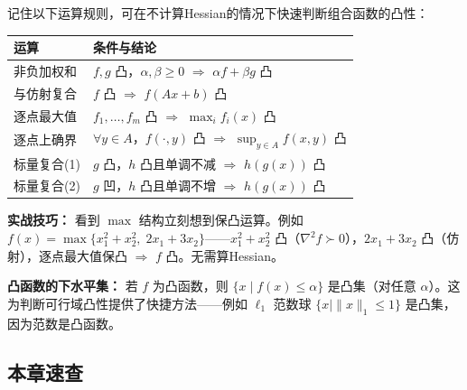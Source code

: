 记住以下运算规则，可在不计算Hessian的情况下快速判断组合函数的凸性：

\begin{tabular}{@{}ll@{}}
\toprule
\textbf{运算} & \textbf{条件与结论} \\
\midrule
非负加权和  & $f,g$ 凸，$\alpha,\beta \ge 0$ $\Rightarrow$ $\alpha f+\beta g$ 凸 \\
与仿射复合  & $f$ 凸 $\Rightarrow$ $f(Ax+b)$ 凸 \\
逐点最大值  & $f_1,\dots,f_m$ 凸 $\Rightarrow$ $\max_i f_i(x)$ 凸 \\
逐点上确界  & $\forall y\in A$，$f(\cdot,y)$ 凸 $\Rightarrow$ $\sup_{y\in A} f(x,y)$ 凸 \\
标量复合(1) & $g$ 凸，$h$ 凸且单调不减 $\Rightarrow$ $h(g(x))$ 凸 \\
标量复合(2) & $g$ 凹，$h$ 凸且单调不增 $\Rightarrow$ $h(g(x))$ 凸 \\
\bottomrule
\end{tabular}

\textbf{实战技巧：} 看到 $\max$ 结构立刻想到保凸运算。例如 $f(x)=\max\{x_1^2+x_2^2,\; 2x_1+3x_2\}$——$x_1^2+x_2^2$ 凸（$\nabla^2 f \succ 0$），$2x_1+3x_2$ 凸（仿射），逐点最大值保凸 $\Rightarrow$ $f$ 凸。无需算Hessian。

\textbf{凸函数的下水平集：} 若 $f$ 为凸函数，则 $\{x \mid f(x) \le \alpha\}$ 是凸集（对任意 $\alpha$）。这为判断可行域凸性提供了快捷方法——例如 $\ell_1$ 范数球 $\{x\mid \|x\|_1\le 1\}$ 是凸集，因为范数是凸函数。

\subsection{本章速查}

